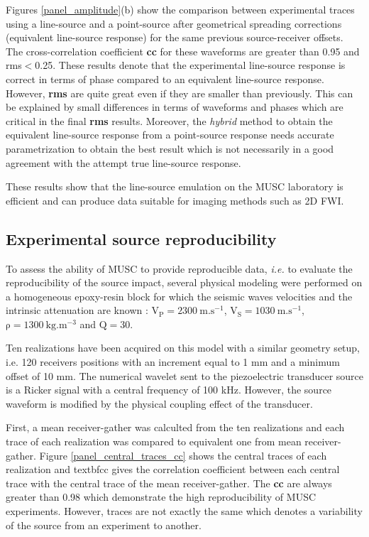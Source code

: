 \documentclass[manuscript,revised]{geophysics}
\begin{document}
\noindent Figures \ref{panel_amplitude}(b) show the comparison between experimental traces using a line-source and a point-source after geometrical spreading corrections (equivalent line-source response) for the same previous source-receiver offsets. The cross-correlation coefficient \textbf{cc} for these waveforms are greater than 0.95 and rms$<$0.25. These results denote that the experimental line-source response is correct in terms of phase compared to an equivalent line-source response. However, \textbf{rms} are quite great even if they are smaller than previously. This can be explained by small differences in terms of waveforms and phases which are critical in the final \textbf{rms} results. Moreover, the \textit{hybrid} method to obtain the equivalent line-source response from a point-source response needs accurate parametrization to obtain the best result which is not necessarily in a good agreement with the attempt true line-source response.   

\noindent These results show that the line-source emulation on the MUSC laboratory is efficient and can produce data suitable for imaging methods such as 2D FWI.


\subsection{Experimental source reproducibility}

\noindent To assess the ability of MUSC to provide reproducible data, \textit{i.e.} to evaluate the reproducibility of the source impact, several physical modeling were performed on a homogeneous epoxy-resin block for which the seismic waves velocities and the intrinsic attenuation are known : $\mathrm{V_{P}=2300\ m.s^{-1}}$, $\mathrm{V_{S}=1030\ m.s^{-1}}$, $\mathrm{\rho=1300\ kg.m^{-3}}$ and $\mathrm{Q=30}$. 

\noindent Ten realizations have been acquired on this model with a similar geometry setup, i.e. 120 receivers positions with an increment equal to 1 mm and a minimum offset of 10 mm. The numerical wavelet sent to the piezoelectric transducer source is a Ricker signal with a central frequency of 100 kHz. However, the source waveform is modified by the physical coupling effect of the transducer. 

\noindent First, a mean receiver-gather was calculted from the ten realizations and each trace of each realization was compared to equivalent one from mean receiver-gather. Figure \ref{panel_central_traces_cc} shows the central traces of each realization and textbf{cc} gives the correlation coefficient between each central trace with the central trace of the mean receiver-gather. The \textbf{cc} are always greater than 0.98 which demonstrate the high reproducibility of MUSC experiments. However, traces are not exactly the same which denotes a variability of the source from an experiment to another.
 
\end{document}
